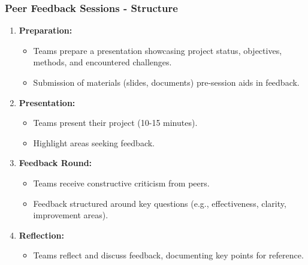 \documentclass[aspectratio=169]{beamer}
\begin{document}
\begin{frame}[fragile]
    \frametitle{Peer Feedback Sessions - Structure}
    \begin{enumerate}
        \item \textbf{Preparation:}
            \begin{itemize}
                \item Teams prepare a presentation showcasing project status, objectives, methods, and encountered challenges.
                \item Submission of materials (slides, documents) pre-session aids in feedback.
            \end{itemize}
        \item \textbf{Presentation:}
            \begin{itemize}
                \item Teams present their project (10-15 minutes).
                \item Highlight areas seeking feedback.
            \end{itemize}
        \item \textbf{Feedback Round:}
            \begin{itemize}
                \item Teams receive constructive criticism from peers.
                \item Feedback structured around key questions (e.g., effectiveness, clarity, improvement areas).
            \end{itemize}
        \item \textbf{Reflection:}
            \begin{itemize}
                \item Teams reflect and discuss feedback, documenting key points for reference.
            \end{itemize}
    \end{enumerate}
\end{frame}
\end{document}
